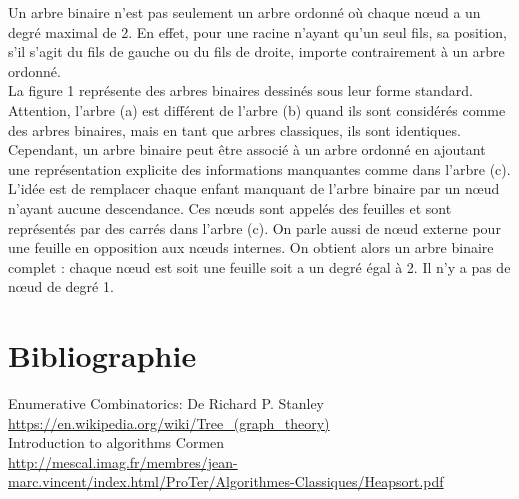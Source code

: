 \documentclass{report}
\begin{document}
Un arbre binaire n'est pas seulement un arbre ordonné où chaque nœud a un degré maximal de 2.  En effet, pour une racine n'ayant qu'un seul fils, sa position, s'il s'agit du fils de gauche ou du fils de droite, importe contrairement à un arbre ordonné.\\
La figure 1 représente des arbres binaires dessinés sous leur forme standard. Attention, l'arbre (a) est différent de l'arbre (b) quand ils sont considérés comme des arbres binaires, mais en tant que arbres classiques, ils sont identiques.\\
Cependant, un arbre binaire peut être associé à un arbre ordonné en ajoutant une représentation explicite des informations manquantes comme dans l'arbre (c). L'idée est de remplacer chaque enfant manquant de l'arbre binaire par un nœud n'ayant aucune descendance. Ces nœuds sont appelés des feuilles et sont représentés par des carrés dans l'arbre (c). On parle aussi de nœud externe pour une feuille en opposition aux nœuds internes. On obtient alors un arbre binaire complet : chaque nœud est soit une feuille soit a un degré égal à 2. Il n'y a pas de nœud de degré 1.\\


\section{Bibliographie}


Enumerative Combinatorics: De Richard P. Stanley \\
\url{https://en.wikipedia.org/wiki/Tree_(graph_theory)}\\
Introduction to algorithms Cormen\\
\url{http://mescal.imag.fr/membres/jean-marc.vincent/index.html/ProTer/Algorithmes-Classiques/Heapsort.pdf}\\

\listoffigures
\end{document}
